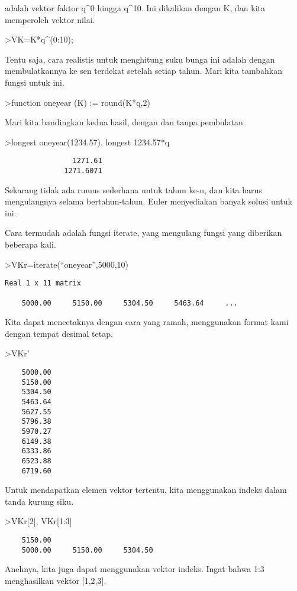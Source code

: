 \documentclass[
]{book}
\begin{document}
adalah vektor faktor q\^{}0 hingga q\^{}10. Ini dikalikan dengan K, dan kita memperoleh vektor nilai.

\textgreater VK=K*q\^{}(0:10);

Tentu saja, cara realistis untuk menghitung suku bunga ini adalah dengan membulatkannya ke sen terdekat setelah setiap tahun. Mari kita tambahkan fungsi untuk ini.

\textgreater function oneyear (K) := round(K*q,2)

Mari kita bandingkan kedua hasil, dengan dan tanpa pembulatan.

\textgreater longest oneyear(1234.57), longest 1234.57*q

\begin{verbatim}
                1271.61 
              1271.6071 
\end{verbatim}

Sekarang tidak ada rumus sederhana untuk tahun ke-n, dan kita harus mengulangnya selama bertahun-tahun. Euler menyediakan banyak solusi untuk ini.

Cara termudah adalah fungsi iterate, yang mengulang fungsi yang diberikan beberapa kali.

\textgreater VKr=iterate(``oneyear'',5000,10)

\begin{verbatim}
Real 1 x 11 matrix

    5000.00     5150.00     5304.50     5463.64     ...
\end{verbatim}

Kita dapat mencetaknya dengan cara yang ramah, menggunakan format kami dengan tempat desimal tetap.

\textgreater VKr'

\begin{verbatim}
    5000.00 
    5150.00 
    5304.50 
    5463.64 
    5627.55 
    5796.38 
    5970.27 
    6149.38 
    6333.86 
    6523.88 
    6719.60 
\end{verbatim}

Untuk mendapatkan elemen vektor tertentu, kita menggunakan indeks dalam tanda kurung siku.

\textgreater VKr{[}2{]}, VKr{[}1:3{]}

\begin{verbatim}
    5150.00 
    5000.00     5150.00     5304.50 
\end{verbatim}

Anehnya, kita juga dapat menggunakan vektor indeks. Ingat bahwa 1:3 menghasilkan vektor {[}1,2,3{]}.
\end{document}
